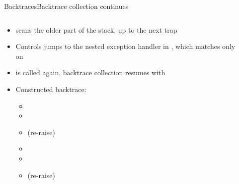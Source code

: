 \begin{frame}{Backtraces}{Backtrace collection continues}
  \begin{columns}[c]
    \begin{column}{0.55\textwidth}
      \minipage[c][0.75\textheight][s]{\columnwidth}
      \begin{itemize}
        \item<1->  scans the older part of the stack, up to the next trap
        \item<6-> Controls jumps to the nested exception handler in , which matches only on 
        \item<7->  is called again, backtrace collection resumes with 
      \end{itemize}
      \medskip
      \begin{itemize}
        \item<2-> Constructed backtrace:
        \begin{itemize}
          \item <2-> 
          \item <2-> 
          \item <3->  (re-raise)
          \item <4-> 
          \item <5-> 
          \item <8->  (re-raise)
        \end{itemize}
      \end{itemize}
      \vfill
      \endminipage
    \end{column}
    \begin{column}{0.45\textwidth}
      \raggedleft
      \onslide*<1>{\providecommand\step{6}}
    \end{column}
  \end{columns}
\end{frame}

